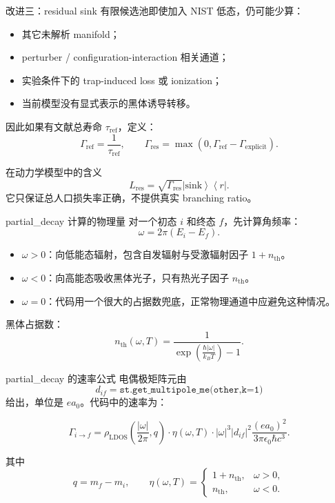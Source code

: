 \documentclass[aspectratio=169,11pt]{ctexbeamer}
\newcommand{\ket}[1]{\left|#1\right\rangle}
\newcommand{\bra}[1]{\left\langle#1\right|}
\begin{document}
\begin{frame}{改进三：residual sink}
  有限候选池即使加入 NIST 低态，仍可能少算：
  \begin{itemize}
    \item 其它未解析 manifold；
    \item perturber / configuration-interaction 相关通道；
    \item 实验条件下的 trap-induced loss 或 ionization；
    \item 当前模型没有显式表示的黑体诱导转移。
  \end{itemize}

  因此如果有文献总寿命 \(\tau_{\mathrm{ref}}\)，定义：
  \[
    \Gamma_{\mathrm{ref}}=\frac{1}{\tau_{\mathrm{ref}}},
    \qquad
    \Gamma_{\mathrm{res}}
    =
    \max\left(0,\Gamma_{\mathrm{ref}}-\Gamma_{\mathrm{explicit}}\right).
  \]

  \begin{block}{在动力学模型中的含义}
    \[
      L_{\mathrm{res}}=\sqrt{\Gamma_{\mathrm{res}}}\ket{\mathrm{sink}}\bra{r}.
    \]
    它只保证总人口损失率正确，不提供真实 branching ratio。
  \end{block}
\end{frame}

\begin{frame}{partial\_decay 计算的物理量}
  对一个初态 \(i\) 和终态 \(f\)，先计算角频率：
  \[
    \omega = 2\pi(E_i-E_f).
  \]

  \begin{itemize}
    \item \(\omega>0\)：向低能态辐射，包含自发辐射与受激辐射因子 \(1+n_{\mathrm{th}}\)。
    \item \(\omega<0\)：向高能态吸收黑体光子，只有热光子因子 \(n_{\mathrm{th}}\)。
    \item \(\omega=0\)：代码用一个很大的占据数兜底，正常物理通道中应避免这种情况。
  \end{itemize}

  黑体占据数：
  \[
    n_{\mathrm{th}}(\omega,T)
    =
    \frac{1}{\exp\left(\frac{\hbar|\omega|}{k_B T}\right)-1}.
  \]
\end{frame}

\begin{frame}{partial\_decay 的速率公式}
  电偶极矩阵元由
  \[
    d_{if}=\texttt{st.get\_multipole\_me(other,k=1)}
  \]
  给出，单位是 \(ea_0\)。代码中的速率为：

  \[
    \Gamma_{i\rightarrow f}
    =
    \rho_{\mathrm{LDOS}}\left(\frac{|\omega|}{2\pi}, q\right)
    \cdot
    \eta(\omega,T)
    \cdot
    |\omega|^3
    |d_{if}|^2
    \frac{(e a_0)^2}{3\pi\epsilon_0\hbar c^3}.
  \]

  其中
  \[
    q=m_f-m_i,\qquad
    \eta(\omega,T)=
    \begin{cases}
      1+n_{\mathrm{th}}, & \omega>0,\\
      n_{\mathrm{th}}, & \omega<0.
    \end{cases}
  \]
\end{frame}
\end{document}
